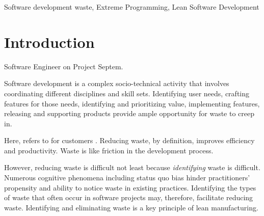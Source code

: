 \begin{IEEEkeywords}
Software development waste,
Extreme Programming,
Lean Software Development
\end{IEEEkeywords}

%
\IEEEpeerreviewmaketitle

\section{Introduction}
 \textemdash Software Engineer on Project Septem.

Software development is a complex socio-technical activity that involves coordinating different disciplines and skill sets. Identifying user needs, crafting features for those needs, identifying and prioritizing value, implementing features, releasing and supporting products provide ample opportunity for waste to creep in. 

Here,  refers to  for customers \cite{WomackLeanThinking}. Reducing waste, by definition, improves efficiency and productivity. Waste is like friction in the development process.

However, reducing waste is difficult not least because \textit{identifying} waste is difficult.  Numerous cognitive phenomena including status quo bias \cite{JostDecadeOfSystemJustification} hinder practitioners' propensity and ability to notice waste in existing practices. Identifying the types of waste that often occur in software projects  may, therefore, facilitate reducing waste. Identifying and eliminating waste is a key principle of lean manufacturing. 

